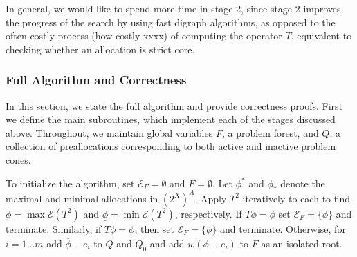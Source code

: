 \documentclass[11pt,reqno]{amsart}
\theoremstyle{definition}
\numberwithin{equation}{section}
\newcommand{\ol}{\overline}
\newcommand{\ul}{\underline}
\newcommand{\pre}{\phi}
\newcommand{\prealloc}{(2^X)^A}
\newcommand{\fix}{\mathcal{E}}
\newcommand{\toppre}{\ol{\pre}}
\newcommand{\acto}{Q_0}
\newcommand{\act}{Q}
\newcommand{\forest}{F}
\newcommand{\fixfind}{\mathcal{E}_F}
\begin{document}
\begin{enumerate}
In general, we would like to spend more time in stage 2, since stage 2 improves the progress of the search by using fast digraph algorithms, as opposed to the often costly process (how costly xxxx) of computing the operator $T$, equivalent to checking whether an allocation is strict core.  

\subsubsection{Full Algorithm and Correctness} \label{fullalgo}
In this section, we state the full algorithm and provide correctness proofs.
First we define the main subroutines, which implement each of the stages discussed above. 
Throughout, we maintain global variables $\forest$, a problem forest, and $\act$, a collection of preallocations corresponding to both active and inactive problem cones. 

To initialize the algorithm, set $\fixfind = \emptyset$ and $F = \emptyset$. 
Let $\pre^*$ and $\pre_*$ denote the maximal and minimal allocations in $\prealloc$. Apply $T^2$ iteratively to each to find $\toppre = \max \fix(T^2)$ and $\ul{\pre} = \min \fix(T^2)$, respectively.
If $T\toppre = \toppre$ set $\fixfind = \{\toppre\}$ and terminate.
Similarly, if $T\ul{\pre} = \ul{\pre}$, then set $\fixfind = \{\ul{\pre}\}$ and terminate. 
Otherwise, for $i = 1 \hdots m$ add $\toppre - e_i$ to $\act$ and $\acto$ and add $w(\pre - e_i)$ to $F$ as an isolated root. 
 

\end{enumerate}
\end{document}
